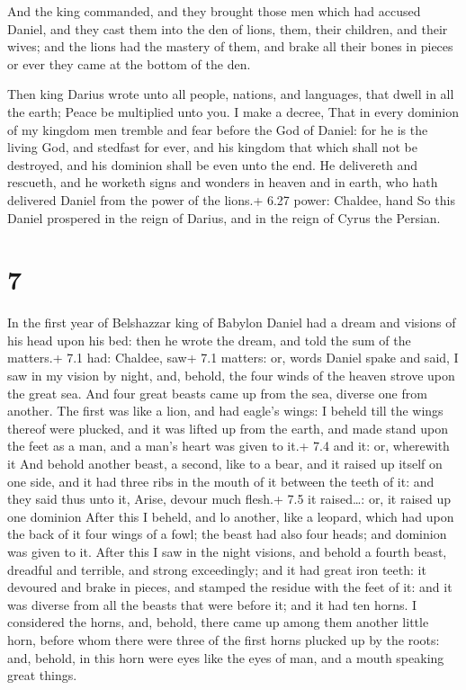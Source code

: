 And the king commanded, and they brought those men which
had accused Daniel, and they cast them into the den of lions, them,
their children, and their wives; and the lions had the mastery of them,
and brake all their bones in pieces or ever they came at the bottom of
the den.

 Then king Darius wrote unto all people, nations, and
languages, that dwell in all the earth; Peace be multiplied unto you.
 I make a decree, That in every dominion of my kingdom men
tremble and fear before the God of Daniel: for he is the living God, and
stedfast for ever, and his kingdom that which shall not be destroyed,
and his dominion shall be even unto the end.  He delivereth
and rescueth, and he worketh signs and wonders in heaven and in earth,
who hath delivered Daniel from the power of the lions.+ 6.27 power:
Chaldee, hand  So this Daniel prospered in the reign of
Darius, and in the reign of Cyrus the Persian.

\hypertarget{section-6}{%
\section{7}\label{section-6}}

 In the first year of Belshazzar king of Babylon Daniel had
a dream and visions of his head upon his bed: then he wrote the dream,
and told the sum of the matters.+ 7.1 had: Chaldee, saw+ 7.1 matters:
or, words  Daniel spake and said, I saw in my vision by
night, and, behold, the four winds of the heaven strove upon the great
sea.  And four great beasts came up from the sea, diverse
one from another.  The first was like a lion, and had
eagle's wings: I beheld till the wings thereof were plucked, and it was
lifted up from the earth, and made stand upon the feet as a man, and a
man's heart was given to it.+ 7.4 and it: or, wherewith it 
And behold another beast, a second, like to a bear, and it raised up
itself on one side, and it had three ribs in the mouth of it between the
teeth of it: and they said thus unto it, Arise, devour much flesh.+ 7.5
it raised\ldots: or, it raised up one dominion  After this I
beheld, and lo another, like a leopard, which had upon the back of it
four wings of a fowl; the beast had also four heads; and dominion was
given to it.  After this I saw in the night visions, and
behold a fourth beast, dreadful and terrible, and strong exceedingly;
and it had great iron teeth: it devoured and brake in pieces, and
stamped the residue with the feet of it: and it was diverse from all the
beasts that were before it; and it had ten horns.  I
considered the horns, and, behold, there came up among them another
little horn, before whom there were three of the first horns plucked up
by the roots: and, behold, in this horn were eyes like the eyes of man,
and a mouth speaking great things.

